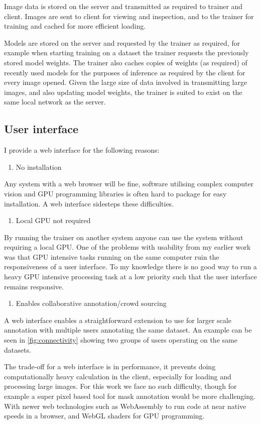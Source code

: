 Image data is stored on the server and transmitted as required to trainer and client. Images are sent to client for viewing and inspection, and to the trainer for training and cached for more efficient loading. 

Models are stored on the server and requested by the trainer as required, for example when starting training on a dataset the trainer requests the previously stored model weights. The trainer also caches copies of weights (as required) of recently used models for the purposes of inference as required by the client for every image opened. Given the large size of data involved in transmitting large images, and also updating model weights, the trainer is suited to exist on the same local network as the server. 



\subsection {User interface}

I provide a web interface for the following reasons:

\begin{enumerate}
    \item No installation
\end{enumerate}
Any system with a web browser will be fine, software utilising complex computer vision and GPU programming libraries is often hard to package for easy installation. A web interface sidesteps these difficulties.
\begin{enumerate}[resume]
    \item Local GPU not required
\end{enumerate}
By running the trainer on another system anyone can use the system without requiring a local GPU. One of the problems with usability from my earlier work was that GPU intensive tasks running on the same computer ruin the responsiveness of a user interface. To my knowledge there is no good way to run a heavy \gls{GPU} intensive processing task at a low priority such that the user interface remains responsive.
\begin{enumerate}[resume]
    \item Enables collaborative annotation/crowd sourcing
\end{enumerate}
A web interface enables a straightforward extension to use for larger scale annotation with multiple users annotating the same dataset. An example can be seen in \ref{fig:connectivity} showing two groups of users operating on the same datasets.


The trade-off for a web interface is in performance, it prevents doing computationally heavy calculation in the client, especially for loading and processing large images. For this work we face no such difficulty, though for example a super pixel based tool for mask annotation would be more challenging. With newer web technologies such as WebAssembly \cite{Haas2017} to run code at near native speeds in a browser, and WebGL shaders for GPU programming.
